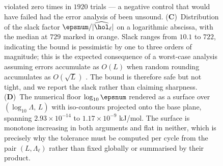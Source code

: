 \begin{figure}[!htbp]
{    violated zero times in $1920$ trials --- a negative control that
    would have failed had the error analysis of
     been unsound.
    (\textbf{C})~Distribution of the slack factor
    $\epsnum/|\widehat{\hol}_\ell|$ on a logarithmic abscissa, with the
    median at $729$ marked in orange.
    Slack ranges from $10.1$ to $722$, indicating the bound is
    pessimistic by one to three orders of magnitude; this is the
    expected consequence of a worst-case analysis assuming errors
    accumulate as $O(L)$ when random rounding accumulates as
    $O(\sqrt{L})$ \citep{higham2002}.
    The bound is therefore safe but not tight, and we report the
    slack rather than claiming sharpness.
    (\textbf{D})~The numerical floor $\log_{10}\epsnum$ rendered as a
    surface over $(\log_{10}\Lambda,\, L)$ with iso-contours projected
    onto the base plane, spanning $2.93\times10^{-14}$ to
    $1.17\times10^{-9}$ kJ/mol.
    The surface is monotone increasing in both arguments and flat in
    neither, which is precisely why the tolerance must be computed per
    cycle from the pair $(L, \Lambda_\ell)$ rather than fixed globally
    or summarised by their product.}
    \label{fig:tol_panel1}
\end{figure}

